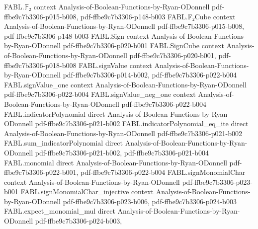 \begin{theorem}
\label{FABL.oddBLRAcceptanceProbability_eq_fourierSum}
\leanok
{}
\proofstep
  {FABL.𝔽₂}
  {context}
  {Analysis-of-Boolean-Functions-by-Ryan-ODonnell}
  {pdf-ffbe9c7b3306-p015-b008,
    pdf-ffbe9c7b3306-p148-b003}
\proofstep
  {FABL.F₂Cube}
  {context}
  {Analysis-of-Boolean-Functions-by-Ryan-ODonnell}
  {pdf-ffbe9c7b3306-p015-b008,
    pdf-ffbe9c7b3306-p148-b003}
\proofstep
  {FABL.Sign}
  {context}
  {Analysis-of-Boolean-Functions-by-Ryan-ODonnell}
  {pdf-ffbe9c7b3306-p020-b001}
\proofstep
  {FABL.SignCube}
  {context}
  {Analysis-of-Boolean-Functions-by-Ryan-ODonnell}
  {pdf-ffbe9c7b3306-p020-b001,
    pdf-ffbe9c7b3306-p018-b008}
\proofstep
  {FABL.signValue}
  {context}
  {Analysis-of-Boolean-Functions-by-Ryan-ODonnell}
  {pdf-ffbe9c7b3306-p014-b002,
    pdf-ffbe9c7b3306-p022-b004}
\proofstep
  {FABL.signValue_one}
  {context}
  {Analysis-of-Boolean-Functions-by-Ryan-ODonnell}
  {pdf-ffbe9c7b3306-p022-b004}
\proofstep
  {FABL.signValue_neg_one}
  {context}
  {Analysis-of-Boolean-Functions-by-Ryan-ODonnell}
  {pdf-ffbe9c7b3306-p022-b004}
\proofstep
  {FABL.indicatorPolynomial}
  {direct}
  {Analysis-of-Boolean-Functions-by-Ryan-ODonnell}
  {pdf-ffbe9c7b3306-p021-b002}
\proofstep
  {FABL.indicatorPolynomial_eq_ite}
  {direct}
  {Analysis-of-Boolean-Functions-by-Ryan-ODonnell}
  {pdf-ffbe9c7b3306-p021-b002}
\proofstep
  {FABL.sum_indicatorPolynomial}
  {direct}
  {Analysis-of-Boolean-Functions-by-Ryan-ODonnell}
  {pdf-ffbe9c7b3306-p021-b002,
    pdf-ffbe9c7b3306-p021-b004}
\proofstep
  {FABL.monomial}
  {direct}
  {Analysis-of-Boolean-Functions-by-Ryan-ODonnell}
  {pdf-ffbe9c7b3306-p022-b001,
    pdf-ffbe9c7b3306-p022-b004}
\proofstep
  {FABL.signMonomialChar}
  {context}
  {Analysis-of-Boolean-Functions-by-Ryan-ODonnell}
  {pdf-ffbe9c7b3306-p023-b001}
\proofstep
  {FABL.signMonomialChar_injective}
  {context}
  {Analysis-of-Boolean-Functions-by-Ryan-ODonnell}
  {pdf-ffbe9c7b3306-p023-b006,
    pdf-ffbe9c7b3306-p024-b003}
\proofstep
  {FABL.expect_monomial_mul}
  {direct}
  {Analysis-of-Boolean-Functions-by-Ryan-ODonnell}
  {pdf-ffbe9c7b3306-p024-b003,
}
\end{theorem}
